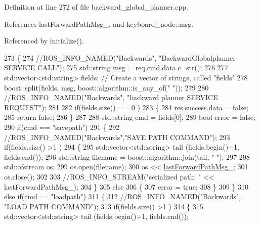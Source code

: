 Definition at line 272 of file backward\+\_\+global\+\_\+planner.\+cpp.



References last\+Forward\+Path\+Msg\+\_\+, and keyboard\+\_\+node\+::msg.



Referenced by initialize().


\begin{DoxyCode}
273 \{
274     \textcolor{comment}{//ROS\_INFO\_NAMED("Backwards", "BackwardGlobalplanner SERVICE CALL");}
275     std::string \hyperlink{namespacekeyboard__node_a768777e12f75b89e4a0a60acf748e9eb}{msg} = req.cmd.data.c\_str();
276 
277     std::vector<std::string> fields;   \textcolor{comment}{// Create a vector of strings, called "fields"}
278     boost::split(fields, msg, boost::algorithm::is\_any\_of(\textcolor{stringliteral}{" "}));
279 
280     \textcolor{comment}{//ROS\_INFO\_NAMED("Backwards", "backward planner SERVICE REQUEST");}
281 
282     \textcolor{keywordflow}{if}(fields.size() == 0 )
283     \{
284         res.success.data = \textcolor{keyword}{false};
285         \textcolor{keywordflow}{return} \textcolor{keyword}{false};
286     \}
287 
288     std::string cmd = fields[0];
289     \textcolor{keywordtype}{bool} error = \textcolor{keyword}{false};
290     \textcolor{keywordflow}{if}(cmd == \textcolor{stringliteral}{"savepath"})
291     \{
292         \textcolor{comment}{//ROS\_INFO\_NAMED("Backwards","SAVE PATH COMMAND");}
293         \textcolor{keywordflow}{if}(fields.size() >1 )
294         \{
295             std::vector<std::string> tail (fields.begin()+1, fields.end());
296             std::string filename = boost::algorithm::join(tail, \textcolor{stringliteral}{" "});
297 
298             std::ofstream os;
299             os.open(filename);
300             os << \hyperlink{classbackward__global__planner_1_1BackwardGlobalPlanner_a2fe940d13931d4e6e27e3c3d5e5a7db8}{lastForwardPathMsg\_};
301             os.close();
302 
303             \textcolor{comment}{//ROS\_INFO\_STREAM("serialized path: " << lastForwardPathMsg\_);}
304         \}
305         \textcolor{keywordflow}{else}
306         \{
307             error = \textcolor{keyword}{true};
308         \}
309     \}
310     \textcolor{keywordflow}{else} \textcolor{keywordflow}{if}(cmd== \textcolor{stringliteral}{"loadpath"})
311     \{
312         \textcolor{comment}{//ROS\_INFO\_NAMED("Backwards", "LOAD PATH COMMAND");}
313         \textcolor{keywordflow}{if}(fields.size() >1 )
314         \{
315             std::vector<std::string> tail (fields.begin()+1, fields.end());

\end{DoxyCode}
